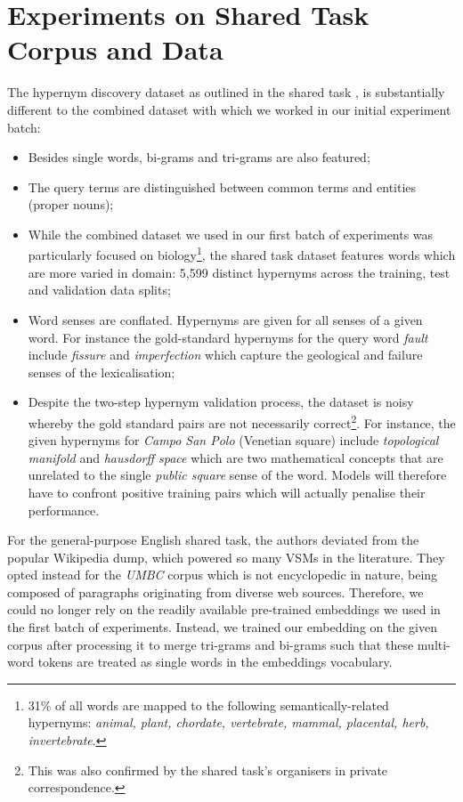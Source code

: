 
\section{Experiments on Shared Task Corpus and Data}
The hypernym discovery dataset as outlined in the shared task \citep{camacho2018semeval}, is substantially different to the combined dataset with which we worked in our initial experiment batch:
\begin{itemize}
    \item Besides single words, bi-grams and tri-grams are also featured;
    \item The query terms are distinguished between common terms and entities (proper nouns);
    \item While the combined dataset we used in our first batch of experiments was particularly focused on biology\footnote{31\% of all words are mapped to the following semantically-related hypernyms: \textit{animal, plant, chordate, vertebrate, mammal, placental, herb, invertebrate}.}, the shared task dataset features words which are more varied in domain: 5,599 distinct hypernyms across the training, test and validation data splits;
    \item Word senses are conflated.  Hypernyms are given for all senses of a given word.  For instance the gold-standard hypernyms for the query word \textit{fault} include \textit{fissure} and \textit{imperfection} which capture the geological and failure senses of the lexicalisation;
    \item Despite the two-step hypernym validation process, the dataset is noisy whereby the gold standard pairs are not necessarily correct\footnote{This was also confirmed by the shared task's organisers in private correspondence.}.  For instance, the given hypernyms for \textit{Campo San Polo} (Venetian square) include \textit{topological manifold} and \textit{hausdorff space} which are two mathematical concepts that are unrelated to the single \textit{public square} sense of the word.  Models will therefore have to confront positive training pairs which will actually penalise their performance.
\end{itemize}

For the general-purpose English shared task, the authors deviated from the popular Wikipedia dump, which powered so many \ac{VSM}s in the literature.  They opted instead for the \textit{UMBC} corpus \citep{han2013umbc_ebiquity} which is not encyclopedic in nature, being composed of paragraphs originating from diverse web sources.  Therefore, we could no longer rely on the readily available pre-trained embeddings we used in the first batch of experiments. Instead, we trained our embedding on the given corpus after processing it to merge tri-grams and bi-grams such that these multi-word tokens are treated as single words in the embeddings vocabulary.  

